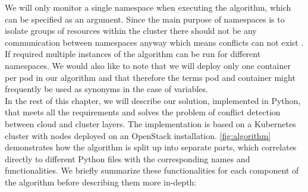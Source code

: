 We will only monitor a single namespace when executing the algorithm, which can be specified as an argument. Since the main purpose of namespaces is to isolate groups of resources within the cluster there should not be any communication between namespaces anyway which means conflicts can not exist \cite{namespace}. If required multiple instances of the algorithm can be run for different namespaces. We would also like to note that we will deploy only one container per pod in our algorithm and that therefore the terms pod and container might frequently be used as synonyms in the case of variables.
\\[10pt]

In the rest of this chapter, we will describe our solution, implemented in Python, that meets all the requirements and solves the problem of conflict detection between cloud and cluster layers. The implementation is based on a Kubernetes cluster with nodes deployed on an OpenStack installation. \autoref{fig:algorithm} demonstrates how the algorithm is split up into separate parts, which correlates directly to different Python files with the corresponding names and functionalities. We briefly summarize these functionalities for each component of the algorithm before describing them more in-depth:

